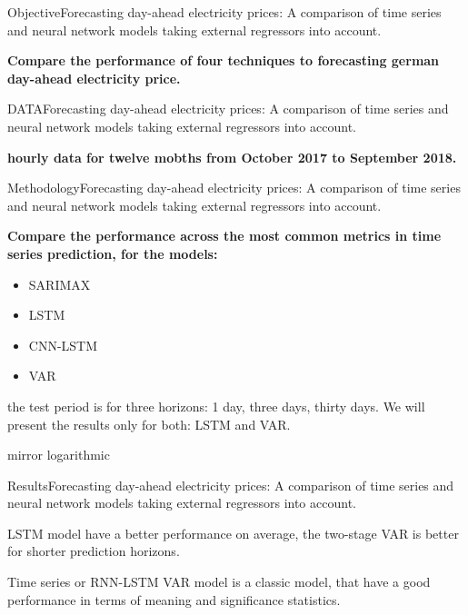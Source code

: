 \documentclass{beamer}
\begin{document}
\begin{frame}{Objective}{Forecasting day-ahead electricity prices: A comparison of time series and
neural network models taking external regressors into account.}

\textbf{Compare the performance of four techniques to forecasting  german day-ahead electricity price.}


\end{frame}



\begin{frame}{DATA}{Forecasting day-ahead electricity prices: A comparison of time series and
neural network models taking external regressors into account.}

\textbf{hourly data for twelve
mobths  from October 2017 to September 2018.}


\end{frame}

\begin{frame}{Methodology}{Forecasting day-ahead electricity prices: A comparison of time series and
neural network models taking external regressors into account.}

\textbf{Compare the performance across the most common metrics in time series prediction, for the models:}
\begin{itemize}
\item SARIMAX
\item LSTM
\item CNN-LSTM
\item VAR 
\end{itemize}
the test period is for three horizons: 1 day, three days, thirty days.
We will present the results only for both: LSTM and VAR.

\end{frame}


\begin{frame}{mirror logarithmic}


\end{frame}



\begin{frame}{Results}{Forecasting day-ahead electricity prices: A comparison of time series and
neural network models taking external regressors into account.}

LSTM model have a better performance on average, the two-stage VAR is better for shorter prediction horizons.


\end{frame}





\begin{frame}{Time series or RNN-LSTM}
VAR model is a classic model, that have a good performance in terms of meaning and  significance statistics.

\end{frame}
\end{document}
